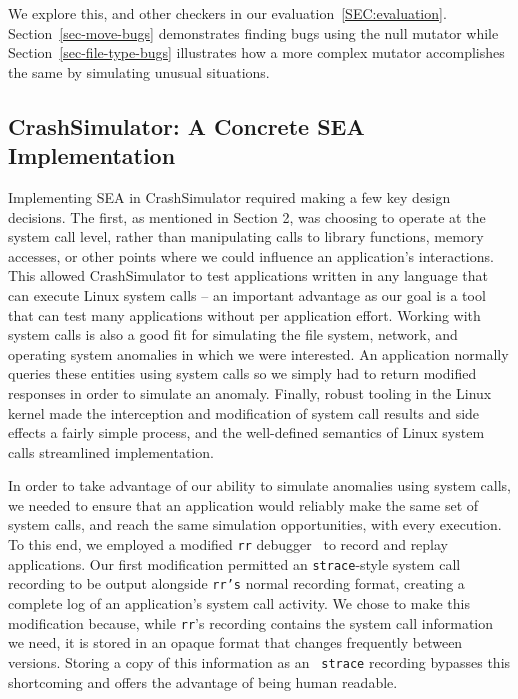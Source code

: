 We explore this, and other checkers in our evaluation~\ref{SEC:evaluation}.
Section~\ref{sec-move-bugs} demonstrates finding bugs using the null
mutator while Section~\ref{sec-file-type-bugs}
illustrates how a more complex
mutator accomplishes the same by simulating unusual situations.


\subsection{CrashSimulator: A Concrete SEA Implementation}
\label{SUBSEC:ApproachCrashSim}
Implementing SEA in CrashSimulator
required making a few key design decisions. The first, as mentioned in
Section 2, was choosing to operate at the system call level, rather than
manipulating calls to library functions, memory accesses, or other points
where we could influence an application’s interactions.
This allowed CrashSimulator
to test applications written in any
language that can execute Linux system
calls -- an important advantage as our
goal is a tool that can test many
applications without per application
effort.
Working with system calls is also a good fit
for simulating the file system,
network, and operating system anomalies in which we were interested.
An application normally queries these entities using system calls
so we simply had to return modified responses in order to simulate an
anomaly.
Finally, robust tooling in the Linux kernel made the
interception and modification of system call results and side effects a
fairly simple process,  and the well-defined semantics of Linux
system calls streamlined implementation.


In order to take advantage of our ability to simulate anomalies using
system calls, we needed to ensure that an application would reliably make
the same set of
system calls, and reach the same simulation opportunities,
with every execution.
To this end,
we employed a modified
{\tt rr} debugger~\cite{rrwebsite} to record and replay applications. Our
first modification permitted an {\tt strace}-style system call recording
to be output alongside {\tt rr's} normal recording format,
creating a complete log of an application’s system call activity.
We chose to make this
modification because, while {\tt rr}'s recording contains the system call
information we need, it is stored in an opaque format that changes
frequently between versions.  Storing a copy of this information as an {\tt
strace} recording bypasses this shortcoming and offers the advantage of
being human readable.

